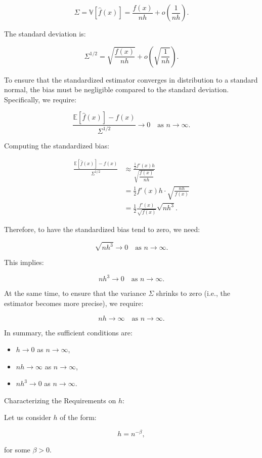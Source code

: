 \documentclass{article}
\begin{document}
\[
\Sigma = \mathbb{V}[\hat{f}(x)] = \frac{f(x)}{n h} + o\left( \frac{1}{n h} \right).
\]

The standard deviation is:

\[
\Sigma^{1/2} = \sqrt{\frac{f(x)}{n h}} + o\left( \sqrt{\frac{1}{n h}} \right).
\]

To ensure that the standardized estimator converges in distribution to a standard normal, the bias must be negligible compared to the standard deviation. Specifically, we require:

\[
\frac{\mathbb{E}[\hat{f}(x)] - f(x)}{\Sigma^{1/2}} \to 0 \quad \text{as } n \to \infty.
\]

Computing the standardized bias:

\[
\begin{aligned}
\frac{\mathbb{E}[\hat{f}(x)] - f(x)}{\Sigma^{1/2}} &\approx \frac{\frac{1}{2} f'(x) h}{\sqrt{\dfrac{f(x)}{n h}}} \\
&= \frac{1}{2} f'(x) h \cdot \sqrt{\frac{n h}{f(x)}} \\
&= \frac{1}{2} \frac{f'(x)}{\sqrt{f(x)}} \sqrt{n h^3}.
\end{aligned}
\]

Therefore, to have the standardized bias tend to zero, we need:

\[
\sqrt{n h^3} \to 0 \quad \text{as } n \to \infty.
\]

This implies:

\[
n h^3 \to 0 \quad \text{as } n \to \infty.
\]

At the same time, to ensure that the variance \(\Sigma\) shrinks to zero (i.e., the estimator becomes more precise), we require:

\[
n h \to \infty \quad \text{as } n \to \infty.
\]

In summary, the sufficient conditions are:

\begin{itemize}
    \item \( h \to 0 \) as \( n \to \infty \),
    \item \( n h \to \infty \) as \( n \to \infty \),
    \item \( n h^3 \to 0 \) as \( n \to \infty \).
\end{itemize}

Characterizing the Requirements on \( h \):

Let us consider \( h \) of the form:

\[
h = n^{-\beta},
\]

for some \( \beta > 0 \).
\end{document}
